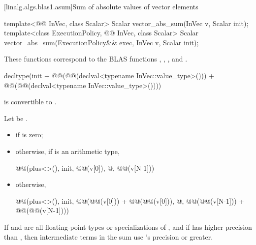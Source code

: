 [linalg.algs.blas1.asum]{Sum of absolute values of vector elements}

%
\begin{itemdecl}
template<@@ InVec, class Scalar>
  Scalar vector_abs_sum(InVec v, Scalar init);
template<class ExecutionPolicy, @@ InVec, class Scalar>
  Scalar vector_abs_sum(ExecutionPolicy&& exec, InVec v, Scalar init);
\end{itemdecl}

\begin{itemdescr}
\pnum
\begin{note}
These functions correspond to the BLAS functions
, , , and \supercite{blas1}.
\end{note}

\pnum
\mandates
\begin{codeblock}
decltype(init + @@(@@(declval<typename InVec::value_type>())) +
                @@(@@(declval<typename InVec::value_type>())))
\end{codeblock}
is convertible to .

\pnum
\returns
Let  be .
\begin{itemize}
\item
{} if  is zero;
\item
otherwise, if  is an arithmetic type,
\begin{codeblock}
@@(plus<>(), init, @@(v[0]), @\ldots@, @@(v[N-1]))
\end{codeblock}
\item
otherwise,
\begin{codeblock}
@@(plus<>(), init,
       @@(@@(v[0])) + @@(@@(v[0])),
       @\ldots@,
       @@(@@(v[N-1])) + @@(@@(v[N-1])))
\end{codeblock}
\end{itemize}

\pnum
\remarks
If  and 
are all floating-point types or specializations of ,
and if  has higher precision
than ,
then intermediate terms in the sum use 's precision or greater.
\end{itemdescr}

